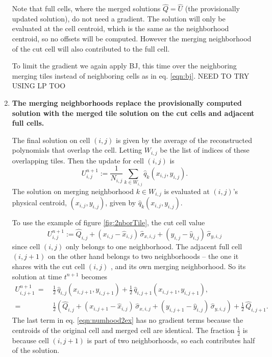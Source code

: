 \begin{enumerate}
Note that full cells, where the merged  solutions $\widehat{Q} =
\widehat{U}$ (the
provisionally updated solution), do not need a gradient. The solution will only be
evaluated at the cell centroid, which is the same as the neighborhood centroid, so
no offsets will be computed. However the merging neighborhood of the cut cell will
also contributed to the full cell.

To limit the gradient we again apply BJ, this time over the neighboring merging tiles 
instead of neighboring cells as in eq. \eqref{eqn:bj}.  NEED TO TRY USING LP TOO


\item
{\bf The merging neighborhoods replace the provisionally computed solution 
with the merged tile solution on the cut cells and adjacent full cells.} 

\vspace*{.1in}
The final solution on cell $(i,j)$ is given by the average of the 
reconstructed polynomials that overlap the cell. Letting $W_{i,j}$ be the list of
indices of these overlapping tiles. Then the update for cell $(i,j)$ is
\begin{equation} \label{eqn:final_update_linear}
U^{n+1}_{i,j} := \frac{1}{N_{i,j}}\sum_{k \in W_{i,j}}\hat{q}_{k}(x_{i,j},y_{i,j}).
\end{equation}
The solution on merging neighborhood $k \in W_{i,j}$ is evaluated at $(i,j)$'s 
physical centroid, $(x_{i,j},y_{i,j})$, given by $\hat{q}_{k}(x_{i,j},y_{i,j})$.  

To use the example of figure \ref{fig:2nborTile}, the cut cell value
\begin{equation}
   U_{i,j}^{n+1} := \widehat{Q}_{i,j} 
   + ( x_{i,j} - \widehat x_{i,j}) \, \widehat{\sigma}_{x,i,j}
   + ( y_{i,j} - \widehat y_{i,j}) \, \widehat{\sigma}_{y,i,j}
\end{equation}
since cell $(i,j)$ only belongs to one neighborhood. The adjacent full cell
$(i,j+1)$ on the other hand belongs to two neighborhoods -- the one it 
shares with
the cut cell $(i,j)$ , and its own merging neighborhood.
So its solution at time $t^{n+1}$  becomes
\begin{equation}
\label{eqn:numhood2ex}
\begin{split}
   U_{i,j+1}^{n+1} \,=\, & \frac{1}{2} \, \widehat{q}_{i,j}(x_{i,j+1},y_{i,j+1})+ 
   \frac{1}{2} \,  \widehat{q}_{i,j+1}(x_{i,j+1},y_{i,j+1}), \\
   = &\frac{1}{2} \left
   (\widehat{Q}_{i,j} 
   + ( x_{i,j+1} - \widehat x_{i,j}) \, \widehat{\sigma}_{x,i,j}
   + ( y_{i,j+1} - \widehat y_{i,j}) \, \widehat{\sigma}_{y,i,j} \right ) + 
   \frac{1}{2} \, \widehat{Q}_{i,j+1} .
\end{split}
\end{equation}
The last term  in eq. \eqref{eqn:numhood2ex} has no gradient terms because the
centroids of the original cell and merged cell are identical.
The fraction $\frac{1}{2}$ is because cell $(i,j+1)$ is part of  two
neighborhoods, so each contributes half of the solution.
\end{enumerate}

